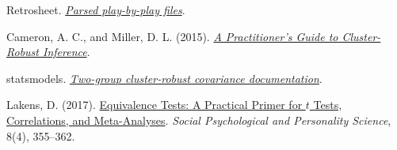 \documentclass[11pt,letterpaper]{article}
\newcommand{\src}[2]{\href{#1}{#2}}
\begin{document}
\begin{thebibliography}{99}
Retrosheet. \src{https://www.retrosheet.org/downloads/plays.html}{\emph{Parsed play-by-play files}}.

Cameron, A. C., and Miller, D. L. (2015).
\src{https://cameron.econ.ucdavis.edu/research/Cameron_Miller_JHR_2015_February.pdf}{\emph{A Practitioner's Guide to Cluster-Robust Inference}}.

statsmodels. \src{https://www.statsmodels.org/stable/generated/statsmodels.stats.sandwich_covariance.cov_cluster_2groups.html}{\emph{Two-group cluster-robust covariance documentation}}.

Lakens, D. (2017).
\src{https://doi.org/10.1177/1948550617697177}{Equivalence Tests: A Practical Primer for $t$ Tests, Correlations, and Meta-Analyses}.
\emph{Social Psychological and Personality Science}, 8(4), 355--362.

\end{thebibliography}
\end{document}
